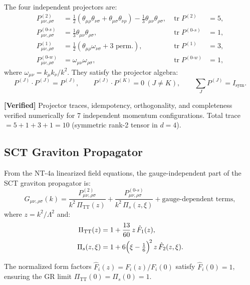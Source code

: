 \documentclass[11pt,a4paper]{article}
\theoremstyle{definition}
\theoremstyle{remark}
\newcommand{\tr}{\operatorname{tr}}
\newcommand{\verified}[1]{%
  \par\smallskip\noindent
  \colorbox{green!10}{\parbox{\dimexpr\linewidth-2\fboxsep}{%
    \textcolor{green!50!black}{\textbf{[Verified]}} #1}}%
  \par\smallskip}
\begin{document}
The four independent projectors are:
\begin{align}
  P^{(2)}_{\mu\nu,\rho\sigma} &= \tfrac{1}{2}(\theta_{\mu\rho}\theta_{\nu\sigma}
    + \theta_{\mu\sigma}\theta_{\nu\rho})
    - \tfrac{1}{3}\theta_{\mu\nu}\theta_{\rho\sigma},
    & \tr P^{(2)} &= 5, \\[4pt]
  P^{(0\text{-}s)}_{\mu\nu,\rho\sigma} &= \tfrac{1}{3}\theta_{\mu\nu}\theta_{\rho\sigma},
    & \tr P^{(0\text{-}s)} &= 1, \\[4pt]
  P^{(1)}_{\mu\nu,\rho\sigma} &= \tfrac{1}{2}(\theta_{\mu\rho}\omega_{\nu\sigma}
    + \text{3 perm.}),
    & \tr P^{(1)} &= 3, \\[4pt]
  P^{(0\text{-}w)}_{\mu\nu,\rho\sigma} &= \omega_{\mu\nu}\omega_{\rho\sigma},
    & \tr P^{(0\text{-}w)} &= 1,
\end{align}
where $\omega_{\mu\nu} = k_\mu k_\nu / k^2$. They satisfy the projector
algebra:
\begin{equation}
  P^{(J)} \cdot P^{(J)} = P^{(J)}, \qquad
  P^{(J)} \cdot P^{(K)} = 0 \ (J \neq K), \qquad
  \sum_{J} P^{(J)} = I_{\mathrm{sym}}.
\end{equation}

\verified{Projector traces, idempotency, orthogonality, and completeness
verified numerically for 7 independent momentum configurations. Total
trace $= 5 + 1 + 3 + 1 = 10$ (symmetric rank-2 tensor in $d=4$).}

\subsection{SCT Graviton Propagator}

From the NT-4a linearized field equations, the gauge-independent part of
the SCT graviton propagator is:
\begin{equation}
  G_{\mu\nu,\rho\sigma}(k) =
    \frac{P^{(2)}_{\mu\nu,\rho\sigma}}{k^2\, \Pi_{\mathrm{TT}}(z)}
  + \frac{P^{(0\text{-}s)}_{\mu\nu,\rho\sigma}}{k^2\, \Pi_s(z,\xi)}
  + \text{gauge-dependent terms},
\end{equation}
where $z = k^2/\Lambda^2$ and:
\begin{align}
  \Pi_{\mathrm{TT}}(z) &= 1 + \frac{13}{60}\, z\, \hat{F}_1(z),
    \label{eq:Pi_TT} \\
  \Pi_s(z,\xi) &= 1 + 6\Bigl(\xi - \tfrac{1}{6}\Bigr)^{\!2}\, z\, \hat{F}_2(z,\xi).
    \label{eq:Pi_s}
\end{align}

The normalized form factors $\hat{F}_i(z) = F_i(z)/F_i(0)$ satisfy
$\hat{F}_i(0) = 1$, ensuring the GR limit $\Pi_{\mathrm{TT}}(0)
= \Pi_s(0) = 1$.
\end{document}
